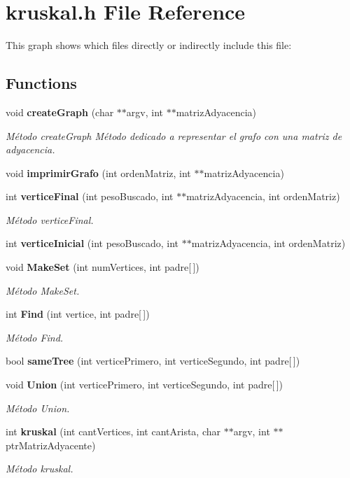 \section{kruskal.\+h File Reference}
\label{kruskal_8h}
This graph shows which files directly or indirectly include this file\+:
\subsection*{Functions}
\begin{DoxyCompactItemize}
\item 
void {\bf create\+Graph} (char $\ast$$\ast$argv, int $\ast$$\ast$matriz\+Adyacencia)
\begin{DoxyCompactList}\small\item\em Método create\+Graph Método dedicado a representar el grafo con una matriz de adyacencia. \end{DoxyCompactList}\item 
void {\bf imprimir\+Grafo} (int orden\+Matriz, int $\ast$$\ast$matriz\+Adyacencia)
\item 
int {\bf vertice\+Final} (int peso\+Buscado, int $\ast$$\ast$matriz\+Adyacencia, int orden\+Matriz)
\begin{DoxyCompactList}\small\item\em Método vertice\+Final. \end{DoxyCompactList}\item 
int {\bf vertice\+Inicial} (int peso\+Buscado, int $\ast$$\ast$matriz\+Adyacencia, int orden\+Matriz)
\item 
void {\bf Make\+Set} (int num\+Vertices, int padre[$\,$])
\begin{DoxyCompactList}\small\item\em Método Make\+Set. \end{DoxyCompactList}\item 
int {\bf Find} (int vertice, int padre[$\,$])
\begin{DoxyCompactList}\small\item\em Método Find. \end{DoxyCompactList}\item 
bool {\bf same\+Tree} (int vertice\+Primero, int vertice\+Segundo, int padre[$\,$])
\item 
void {\bf Union} (int vertice\+Primero, int vertice\+Segundo, int padre[$\,$])
\begin{DoxyCompactList}\small\item\em Método Union. \end{DoxyCompactList}\item 
int {\bf kruskal} (int cant\+Vertices, int cant\+Arista, char $\ast$$\ast$argv, int $\ast$$\ast$ptr\+Matriz\+Adyacente)
\begin{DoxyCompactList}\small\item\em Método kruskal. \end{DoxyCompactList}\end{DoxyCompactItemize}


